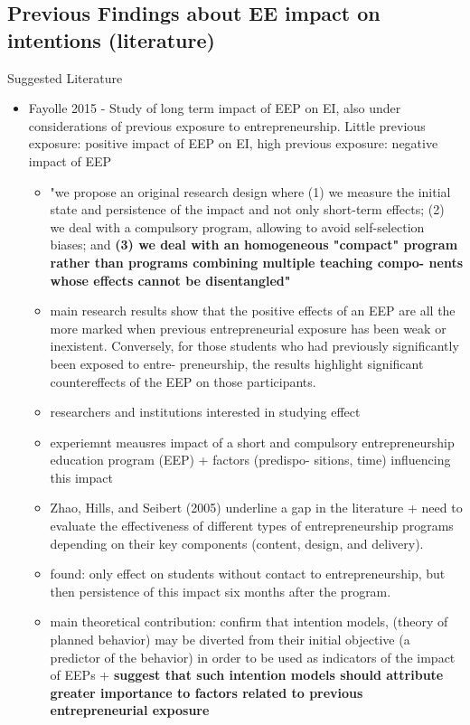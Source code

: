 \subsection{Previous Findings about EE impact on intentions (literature)}
Suggested Literature
\begin{itemize}
\item Fayolle 2015 - Study of long term impact of EEP on EI, also under considerations of previous exposure to entrepreneurship. Little previous exposure: positive impact of EEP on EI, high previous exposure: negative impact of EEP
\begin{itemize}
\item "we propose an original research design where (1) we measure the initial state and persistence of the impact and not only short-term effects; (2) we deal with a compulsory program, allowing to avoid self-selection biases; and \textbf{(3) we deal with an homogeneous "compact" program rather than programs combining multiple teaching compo- nents whose effects cannot be disentangled"}
\item main research results show that the positive effects of an EEP are all the more marked when previous entrepreneurial exposure has been weak or inexistent. Conversely, for those students who had previously significantly been exposed to entre- preneurship, the results highlight significant countereffects of the EEP on those participants.
\item researchers and institutions interested in studying effect
\item experiemnt meausres  impact of a short and compulsory entrepreneurship education program (EEP) + factors (predispo- sitions, time) influencing this impact
\item Zhao, Hills, and Seibert (2005) underline a gap in the literature + need to evaluate the effectiveness of different types of entrepreneurship programs depending on their key components (content, design, and delivery). 
\item found: only effect on students without contact to entrepreneurship, but then persistence of this impact six months after the program.
\item main theoretical contribution: confirm that intention models, (theory of planned behavior) may be diverted from their initial objective (a predictor of the behavior) in order to be used as indicators of the impact of EEPs + \textbf{suggest that such intention models should attribute greater importance to factors related to previous entrepreneurial exposure}

\end{itemize}
\end{itemize}
